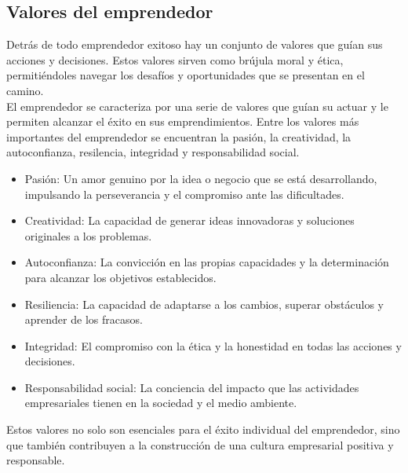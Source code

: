 \documentclass{article}
\begin{document}
\subsection{Valores del emprendedor}
Detrás de todo emprendedor exitoso hay un conjunto de valores que guían sus acciones y decisiones. Estos valores sirven como brújula moral y ética, permitiéndoles navegar los desafíos y oportunidades que se presentan en el camino.
\vspace{0.5cm}\\
El emprendedor se caracteriza por una serie de valores que guían su actuar y le permiten alcanzar el éxito en sus emprendimientos. Entre los valores más importantes del emprendedor se encuentran la pasión, la creatividad, la autoconfianza, resilencia, integridad y responsabilidad social.
\begin{itemize}
\item
    Pasión: Un amor genuino por la idea o negocio que se está desarrollando, impulsando la perseverancia y el compromiso ante las dificultades.
\item
    Creatividad: La capacidad de generar ideas innovadoras y soluciones originales a los problemas.
\item
    Autoconfianza: La convicción en las propias capacidades y la determinación para alcanzar los objetivos establecidos.
\item
    Resiliencia: La capacidad de adaptarse a los cambios, superar obstáculos y aprender de los fracasos.
\item
    Integridad: El compromiso con la ética y la honestidad en todas las acciones y decisiones.
\item
    Responsabilidad social: La conciencia del impacto que las actividades empresariales tienen en la sociedad y el medio ambiente.
\end{itemize}
Estos valores no solo son esenciales para el éxito individual del emprendedor, sino que también contribuyen a la construcción de una cultura empresarial positiva y responsable.
\end{document}
